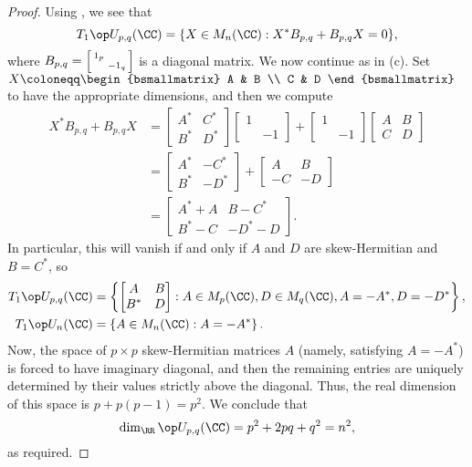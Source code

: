 \documentclass[../notes.tex]{subfiles}
\begin{document}
\begin{proof}
	Using , we see that
	\[T_1\op U_{p,q}(\CC)=\{X\in M_n(\CC):X^*B_{p,q}+B_{p,q}X=0\},\]
	where $B_{p,q}=\begin{bsmallmatrix}
		1_p \\ & -1_q
	\end{bsmallmatrix}$ is a diagonal matrix. We now continue as in (c). Set $X\coloneqq\begin{bsmallmatrix}
		A & B \\ C & D
	\end{bsmallmatrix}$ to have the appropriate dimensions, and then we compute
	\begin{align*}
		X^*B_{p,q}+B_{p,q}X &= \begin{bmatrix}
			A^* & C^* \\ B^* & D^*
		\end{bmatrix}\begin{bmatrix}
			1 \\ & -1
		\end{bmatrix}+\begin{bmatrix}
			1 \\ & -1
		\end{bmatrix}\begin{bmatrix}
			A & B \\ C & D
		\end{bmatrix} \\
		&= \begin{bmatrix}
			A^* & -C^* \\ B^* & -D^*
		\end{bmatrix}+\begin{bmatrix}
			A & B \\ -C & -D
		\end{bmatrix} \\
		&= \begin{bmatrix}
			A^*+A & B-C^* \\ B^*-C & -D^*-D
		\end{bmatrix}.
	\end{align*}
	In particular, this will vanish if and only if $A$ and $D$ are skew-Hermitian and $B=C^*$, so
	\begin{align*}
		T_1\op U_{p,q}(\CC) &= \left\{\begin{bmatrix}
			A & B \\ B^* & D
		\end{bmatrix}:A\in M_p(\CC),D\in M_q(\CC),A=-A^*,D=-D^*\right\}, \\
		T_1\op U_n(\CC) &= \left\{A\in M_n(\CC):A=-A^*\right\}.
	\end{align*}
	Now, the space of $p\times p$ skew-Hermitian matrices $A$ (namely, satisfying $A=-A^*$) is forced to have imaginary diagonal, and then the remaining entries are uniquely determined by their values strictly above the diagonal. Thus, the real dimension of this space is $p+p(p-1)=p^2$. We conclude that
	\[\dim_\RR\op U_{p,q}(\CC) = p^2+2pq+q^2=n^2,\]
	as required.
\end{proof}
\end{document}
